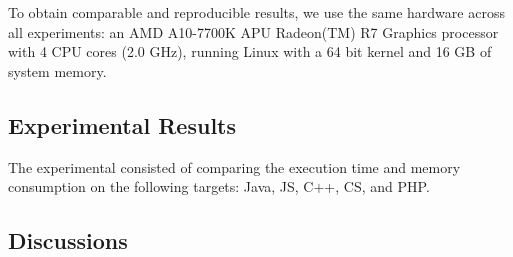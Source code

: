  


To obtain comparable and reproducible results, we use the
same hardware across all experiments: an AMD A10-7700K
APU Radeon(TM) R7 Graphics processor with 4 CPU cores
(2.0 GHz), running Linux with a 64 bit kernel and 16 GB of
system memory.

\subsection{Experimental Results}
The experimental consisted of comparing the execution time and memory consumption on the following targets: Java, JS, C++, CS, and PHP.



\subsection{Discussions}









\iffalse


